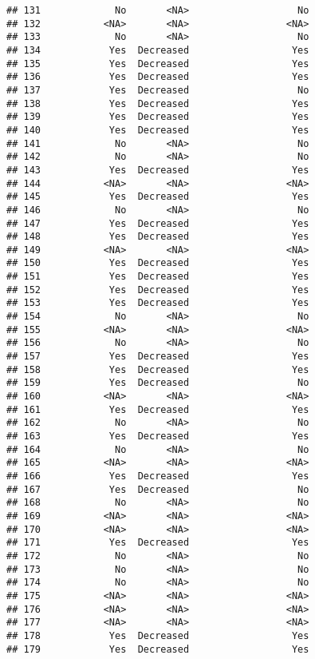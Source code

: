 \documentclass[
]{article}
\begin{document}
\begin{verbatim}
## 131             No       <NA>                   No
## 132           <NA>       <NA>                 <NA>
## 133             No       <NA>                   No
## 134            Yes  Decreased                  Yes
## 135            Yes  Decreased                  Yes
## 136            Yes  Decreased                  Yes
## 137            Yes  Decreased                   No
## 138            Yes  Decreased                  Yes
## 139            Yes  Decreased                  Yes
## 140            Yes  Decreased                  Yes
## 141             No       <NA>                   No
## 142             No       <NA>                   No
## 143            Yes  Decreased                  Yes
## 144           <NA>       <NA>                 <NA>
## 145            Yes  Decreased                  Yes
## 146             No       <NA>                   No
## 147            Yes  Decreased                  Yes
## 148            Yes  Decreased                  Yes
## 149           <NA>       <NA>                 <NA>
## 150            Yes  Decreased                  Yes
## 151            Yes  Decreased                  Yes
## 152            Yes  Decreased                  Yes
## 153            Yes  Decreased                  Yes
## 154             No       <NA>                   No
## 155           <NA>       <NA>                 <NA>
## 156             No       <NA>                   No
## 157            Yes  Decreased                  Yes
## 158            Yes  Decreased                  Yes
## 159            Yes  Decreased                   No
## 160           <NA>       <NA>                 <NA>
## 161            Yes  Decreased                  Yes
## 162             No       <NA>                   No
## 163            Yes  Decreased                  Yes
## 164             No       <NA>                   No
## 165           <NA>       <NA>                 <NA>
## 166            Yes  Decreased                  Yes
## 167            Yes  Decreased                   No
## 168             No       <NA>                   No
## 169           <NA>       <NA>                 <NA>
## 170           <NA>       <NA>                 <NA>
## 171            Yes  Decreased                  Yes
## 172             No       <NA>                   No
## 173             No       <NA>                   No
## 174             No       <NA>                   No
## 175           <NA>       <NA>                 <NA>
## 176           <NA>       <NA>                 <NA>
## 177           <NA>       <NA>                 <NA>
## 178            Yes  Decreased                  Yes
## 179            Yes  Decreased                  Yes

\end{verbatim}
\end{document}
